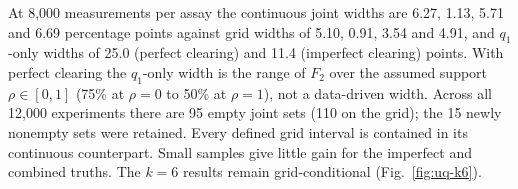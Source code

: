 At 8,000 measurements per assay the continuous joint widths are 6.27, 1.13, 5.71
and 6.69 percentage points against grid widths of 5.10, 0.91, 3.54 and 4.91, and
$q_1$-only widths of 25.0 (perfect clearing) and 11.4 (imperfect clearing)
points. With perfect clearing the $q_1$-only width is the range of $F_2$ over the
assumed support $\rho\in[0,1]$ (75\% at $\rho=0$ to 50\% at $\rho=1$), not a
data-driven width. Across all 12,000 experiments there are 95 empty joint sets (110 on the
grid); the 15 newly nonempty sets were retained. Every defined grid interval is
contained in its continuous counterpart. Small samples give little gain for the
imperfect and combined truths. The $k=6$ results remain grid-conditional
(Fig.~\ref{fig:uq-k6}).

